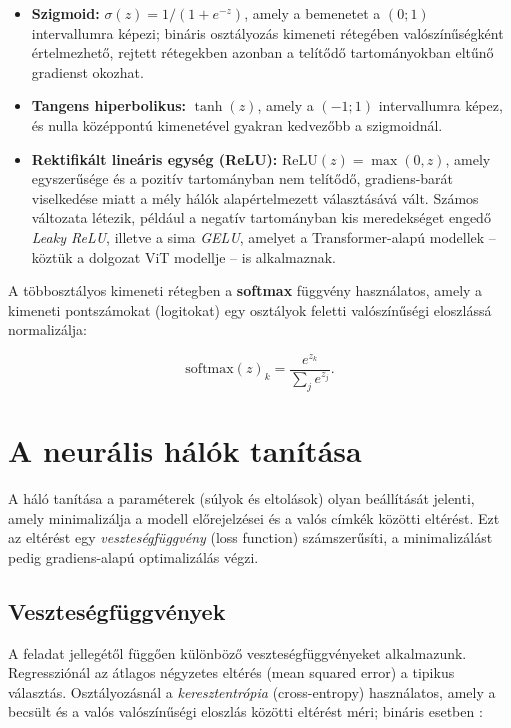 \begin{itemize}
  \item \textbf{Szigmoid:} $\sigma(z) = 1/(1 + e^{-z})$, amely a bemenetet a
  $(0;1)$ intervallumra képezi; bináris osztályozás kimeneti rétegében
  valószínűségként értelmezhető, rejtett rétegekben azonban a telítődő
  tartományokban eltűnő gradienst okozhat.
  \item \textbf{Tangens hiperbolikus:} $\tanh(z)$, amely a $(-1;1)$ intervallumra
  képez, és nulla középpontú kimenetével gyakran kedvezőbb a szigmoidnál.
  \item \textbf{Rektifikált lineáris egység (ReLU):} $\mathrm{ReLU}(z) = \max(0,
  z)$, amely egyszerűsége és a pozitív tartományban nem telítődő, gradiens-barát
  viselkedése miatt a mély hálók alapértelmezett választásává vált. Számos
  változata létezik, például a negatív tartományban kis meredekséget engedő
  \textit{Leaky ReLU}, illetve a sima \textit{GELU}, amelyet a Transformer-alapú
  modellek -- köztük a dolgozat ViT modellje -- is alkalmaznak.
\end{itemize}

A többosztályos kimeneti rétegben a \textbf{softmax} függvény használatos, amely
a kimeneti pontszámokat (logitokat) egy osztályok feletti valószínűségi
eloszlássá normalizálja:

\begin{equation}
  \mathrm{softmax}(z)_k = \frac{e^{z_k}}{\sum_{j} e^{z_j}}.
  \label{eq:softmax}
\end{equation}

\section{A neurális hálók tanítása}

A háló tanítása a paraméterek (súlyok és eltolások) olyan beállítását jelenti,
amely minimalizálja a modell előrejelzései és a valós címkék közötti eltérést. Ezt
az eltérést egy \textit{veszteségfüggvény} (loss function) számszerűsíti, a
minimalizálást pedig gradiens-alapú optimalizálás végzi.

\subsection{Veszteségfüggvények}

A feladat jellegétől függően különböző veszteségfüggvényeket alkalmazunk.
Regressziónál az átlagos négyzetes eltérés (mean squared error) a tipikus
választás. Osztályozásnál a \textit{keresztentrópia} (cross-entropy) használatos,
amely a becsült és a valós valószínűségi eloszlás közötti eltérést méri; bináris
esetben \cite{goodfellow2016deep}:

